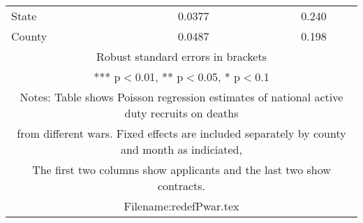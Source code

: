 \documentclass[]{article}
\begin{document}
\begin{tabular}{lcccc}
State &  & 0.0377 &  & 0.240 \\
 County &  & 0.0487 &  & 0.198 \\ \hline
\multicolumn{5}{c}{ Robust standard errors in brackets} \\
\multicolumn{5}{c}{ *** p$<$0.01, ** p$<$0.05, * p$<$0.1} \\
\multicolumn{5}{c}{ Notes: Table shows Poisson regression estimates of national active duty recruits on deaths} \\
\multicolumn{5}{c}{ from different wars. Fixed effects are included separately by county and month as indiciated,} \\
\multicolumn{5}{c}{ The first two columns show applicants and the last two show contracts.} \\
\multicolumn{5}{c}{ Filename:redefPwar.tex} \\
\end{tabular}
\end{document}
